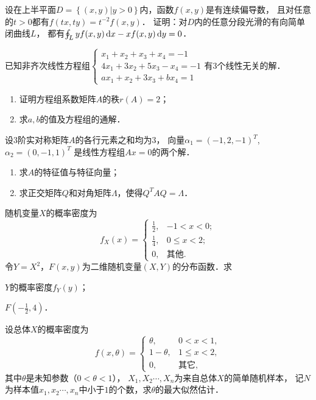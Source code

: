 \documentclass[plain,noanswer,medmath]{../../template/jnuexam}
\begin{document}
\begin{problem}[points=12]
设在上半平面$D = \left\{(x,y) \big| y > 0\right\}$内，函数$f(x,y)$是有连续偏导数，
且对任意的$t > 0$都有$f(tx,ty) = t^{-2} f(x,y)$．
证明：对$D$内的任意分段光滑的有向简单闭曲线$L$，
都有$\oint_L y f(x,y)\mathop{}\!\mathrm{d} x - xf(x,y)\mathop{}\!\mathrm{d} y = 0$．
\end{problem}


\begin{problem}[points=9]
已知非齐次线性方程组$\begin{cases}
  x_1 + x_2 + x_3 + x_4 = - 1 \\
  4x_1 + 3x_2 + 5x_3 - x_4 = - 1 \\
  ax_1 + x_2 + 3x_3 + bx_4 = 1
\end{cases}$有$3$个线性无关的解．
\begin{enumerate}
\item 证明方程组系数矩阵$A$的秩$r(A) = 2$；
\item 求$a,b$的值及方程组的通解．
\end{enumerate}
\end{problem}


\begin{problem}[points=9]
设$3$阶实对称矩阵$A$的各行元素之和均为$3$，
向量$\alpha_1 = \left(- 1,2, - 1 \right)^T$,$\alpha_2 = \left(0, - 1,1 \right)^T$
是线性方程组$Ax = 0$的两个解．
\begin{enumerate}
\item 求$A$的特征值与特征向量；
\item 求正交矩阵$Q$和对角矩阵$\Lambda$，使得$Q^T AQ = \Lambda$．
\end{enumerate}
\end{problem}


\begin{problem}[points=9]
随机变量$X$的概率密度为
$$f_X(x) = \begin{cases}
  \frac{1}{2}, & -1 < x < 0; \\
  \frac{1}{4}, & 0 \le x < 2; \\
            0, & \text{其他}.
\end{cases}$$
$\text{令}Y = X^2$，$F\left(x,y \right)$为二维随机变量$(X,Y)$的分布函数．求\par
\begin{enumerate*}
\item $Y$的概率密度$f_Y(y)$；
\item $F\left(-\frac{1}{2},4\right)$．
\end{enumerate*}
\end{problem}


\begin{problem}[points=9]
设总体$X$的概率密度为
$$f(x,\theta) = \begin{cases}
      \theta , & 0 < x < 1, \\
  1 - \theta , & 1 \le x < 2, \\
            0, & \text{其它},
\end{cases}$$
其中$\theta$是未知参数（$0 < \theta < 1$），
$X_1,X_2\cdots ,X_{n}$为来自总体$X$的简单随机样本，
记$N$为样本值$x_1,x_2\cdots ,x_n$中小于$1$的个数，求$\theta$的最大似然估计．
\end{problem}
\end{document}
